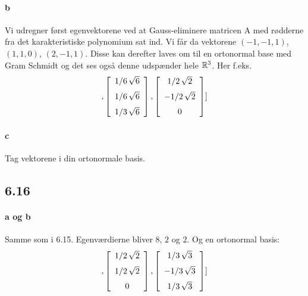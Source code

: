 			\paragraph{b} Vi udregner først egenvektorene ved at Gauss-eliminere matricen A med rødderne fra det karakteristiske polynomium sat ind. Vi får da vektorene $(-1,-1,1)$, $(1,1,0)$, $(2,-1,1)$. Disse kan derefter laves om til en ortonormal base med Gram Schmidt og det ses også denne udspænder hele $\mathbb{R}^3$. Her f.eks.
				\begin{align*} %
					[ \left[ \begin {array}{c} -1/3\,\sqrt {3}\\ \noalign{\medskip}-1/3\,
\sqrt {3}\\ \noalign{\medskip}1/3\,\sqrt {3}\end {array} \right] ,
 \left[ \begin {array}{c} 1/6\,\sqrt {6}\\ \noalign{\medskip}1/6\,
\sqrt {6}\\ \noalign{\medskip}1/3\,\sqrt {6}\end {array} \right] ,
 \left[ \begin {array}{c} 1/2\,\sqrt {2}\\ \noalign{\medskip}-1/2\,
\sqrt {2}\\ \noalign{\medskip}0\end {array} \right] ]
				\end{align*} 

			\paragraph{c} Tag vektorene i din ortonormale basis.

		\subsection{6.16}

			\paragraph{a og b} Samme som i 6.15. Egenværdierne bliver $8$, $2$ og $2$. Og en ortonormal basis:
				\begin{align*} %
					[ \left[ \begin {array}{c} -1/6\,\sqrt {6}\\ \noalign{\medskip}1/6\,
\sqrt {6}\\ \noalign{\medskip}1/3\,\sqrt {6}\end {array} \right] ,
 \left[ \begin {array}{c} 1/2\,\sqrt {2}\\ \noalign{\medskip}1/2\,
\sqrt {2}\\ \noalign{\medskip}0\end {array} \right] , \left[ 
\begin {array}{c} 1/3\,\sqrt {3}\\ \noalign{\medskip}-1/3\,\sqrt {3}
\\ \noalign{\medskip}1/3\,\sqrt {3}\end {array} \right] ]
				\end{align*} 

